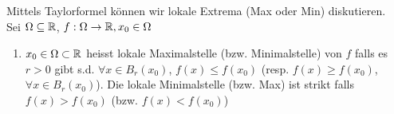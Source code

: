 \noindent Mittels Taylorformel können wir lokale Extrema (Max oder Min) diskutieren. \\

\noindent Sei $\Omega\subseteq\mathbb{R}$, $f:\Omega\to\mathbb{R}, x_0\in\Omega$

\begin{definition}{5.38}
\begin{enumerate}
\item $x_0\in\Omega\subset\mathbb{R}$ heisst lokale Maximalstelle (bzw. Minimalstelle) von $f$ falls es $r>0$ gibt s.d. $\forall x\in B_r(x_0)$, $f(x)\leq f(x_0)$ (resp. $f(x)\geq f(x_0)$, $\forall x\in B_r(x_0)$). Die lokale Minimalstelle (bzw. Max) ist strikt falls $f(x)>f(x_0)$ (bzw. $f(x)<f(x_0)$)
\end{enumerate}

\end{definition}